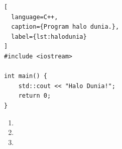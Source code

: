 \begin{lstlisting}[
  language=C++,
  caption={Program halo dunia.},
  label={lst:halodunia}
]
#include <iostream>

int main() {
    std::cout << "Halo Dunia!";
    return 0;
}
\end{lstlisting}

\lipsum[12]

\begin{enumerate}
  \item \lipsum[13][1-4]
  \item \lipsum[13][5-8]
  \item \lipsum[13][9-12]
\end{enumerate}

\lipsum[14-15]
